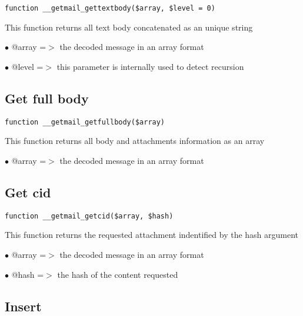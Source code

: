 \documentclass[a4paper]{book}
\begin{document}
\begin{lstlisting}
function __getmail_gettextbody($array, $level = 0)
\end{lstlisting}

This function returns all text body concatenated as an unique string

\begin{compactitem}
\item[\color{myblue}$\bullet$] @array =$>$ the decoded message in an array format
\item[\color{myblue}$\bullet$] @level =$>$ this parameter is internally used to detect recursion
\end{compactitem}

\hypertarget{toc547}{}
\subsection{Get full body}

\begin{lstlisting}
function __getmail_getfullbody($array)
\end{lstlisting}

This function returns all body and attachments information as an array

\begin{compactitem}
\item[\color{myblue}$\bullet$] @array =$>$ the decoded message in an array format
\end{compactitem}

\hypertarget{toc548}{}
\subsection{Get cid}

\begin{lstlisting}
function __getmail_getcid($array, $hash)
\end{lstlisting}

This function returns the requested attachment indentified by the hash argument

\begin{compactitem}
\item[\color{myblue}$\bullet$] @array =$>$ the decoded message in an array format
\item[\color{myblue}$\bullet$] @hash  =$>$ the hash of the content requested
\end{compactitem}

\hypertarget{toc549}{}
\subsection{Insert}
\end{document}
